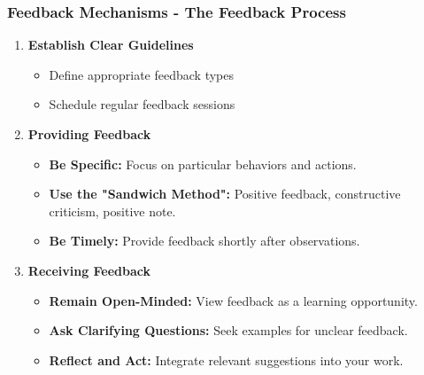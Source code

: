 \documentclass[aspectratio=169]{beamer}
\begin{document}
\begin{frame}[fragile]
    \frametitle{Feedback Mechanisms - The Feedback Process}
    \begin{enumerate}
        \item \textbf{Establish Clear Guidelines}
        \begin{itemize}
            \item Define appropriate feedback types
            \item Schedule regular feedback sessions
        \end{itemize}

        \item \textbf{Providing Feedback}
        \begin{itemize}
            \item \textbf{Be Specific:} Focus on particular behaviors and actions.
            \item \textbf{Use the "Sandwich Method":} Positive feedback, constructive criticism, positive note.
            \item \textbf{Be Timely:} Provide feedback shortly after observations.
        \end{itemize}
        
        \item \textbf{Receiving Feedback}
        \begin{itemize}
            \item \textbf{Remain Open-Minded:} View feedback as a learning opportunity.
            \item \textbf{Ask Clarifying Questions:} Seek examples for unclear feedback.
            \item \textbf{Reflect and Act:} Integrate relevant suggestions into your work.
        \end{itemize}
    \end{enumerate}
\end{frame}
\end{document}
